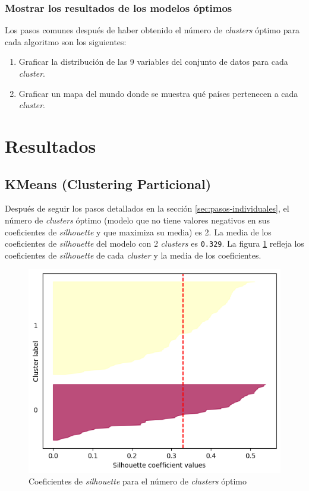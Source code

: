 \documentclass{article}
\begin{document}
\subsubsection{Mostrar los resultados de los modelos óptimos}

\noindent Los pasos comunes después de haber obtenido el número de \textit{clusters} óptimo para cada algoritmo son los siguientes:

\begin{enumerate}
  \item Graficar la distribución de las 9 variables del conjunto de datos para cada \textit{cluster}.
  \item Graficar un mapa del mundo donde se muestra qué países pertenecen a cada \textit{cluster}.
\end{enumerate}

\section{Resultados}

\subsection{KMeans (Clustering Particional)}
\label{sec:kmeans}

\noindent Después de seguir los pasos detallados en la sección \ref{sec:pasos-individuales}, el número de \textit{clusters} óptimo (modelo que no tiene valores negativos en sus coeficientes de \textit{silhouette} y que maximiza su media) es 2.
La media de los coeficientes de \textit{silhouette} del modelo con 2 \textit{clusters} es \verb|0.329|.
La figura \ref{fig:silhouette} refleja los coeficientes de \textit{silhouette} de cada \textit{cluster} y la media de los coeficientes.

\begin{figure}[H]
  \centering
  \includegraphics[width=0.5\linewidth]{../images/kmeans/silhouette.png}
  \caption{Coeficientes de \textit{silhouette} para el número de \textit{clusters} óptimo}
  \label{fig:silhouette}
\end{figure}
\end{document}
